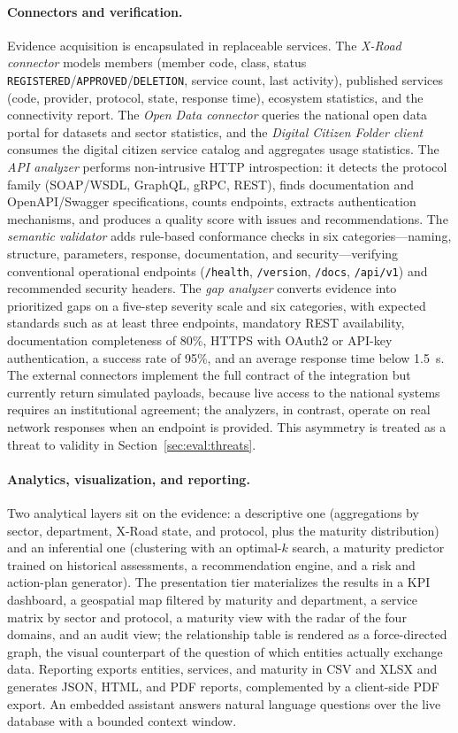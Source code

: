 \documentclass[runningheads]{llncs}
\begin{document}
\paragraph{Connectors and verification.} Evidence acquisition is encapsulated
in replaceable services. The \emph{X-Road connector} models members (member
code, class, status \texttt{REGISTERED}/\texttt{APPROVED}/\texttt{DELETION},
service count, last activity), published services (code, provider, protocol,
state, response time), ecosystem statistics, and the connectivity report. The
\emph{Open Data connector} queries the national open data portal for datasets
and sector statistics, and the \emph{Digital Citizen Folder client} consumes
the digital citizen service catalog and aggregates usage statistics. The
\emph{API analyzer} performs non-intrusive HTTP introspection: it detects the
protocol family (SOAP/WSDL, GraphQL, gRPC, REST), finds documentation and
OpenAPI/Swagger specifications, counts endpoints, extracts authentication
mechanisms, and produces a quality score with issues and recommendations. The
\emph{semantic validator} adds rule-based conformance checks in six
categories---naming, structure, parameters, response, documentation, and
security---verifying conventional operational endpoints
(\texttt{/health}, \texttt{/version}, \texttt{/docs}, \texttt{/api/v1}) and
recommended security headers. The \emph{gap analyzer} converts evidence into
prioritized gaps on a five-step severity scale and six categories, with
expected standards such as at least three endpoints, mandatory REST
availability, documentation completeness of 80\%, HTTPS with OAuth2 or API-key
authentication, a success rate of 95\%, and an average response time below
1.5~s. The external connectors implement the full contract of the integration
but currently return simulated payloads, because live access to the national
systems requires an institutional agreement; the analyzers, in contrast,
operate on real network responses when an endpoint is provided. This
asymmetry is treated as a threat to validity in Section~\ref{sec:eval:threats}.

\paragraph{Analytics, visualization, and reporting.} Two analytical layers
sit on the evidence: a descriptive one (aggregations by sector, department,
X-Road state, and protocol, plus the maturity distribution) and an inferential
one (clustering with an optimal-$k$ search, a maturity predictor trained on
historical assessments, a recommendation engine, and a risk and action-plan
generator). The presentation tier materializes the results in a KPI dashboard,
a geospatial map filtered by maturity and department, a service matrix by
sector and protocol, a maturity view with the radar of the four domains, and
an audit view; the relationship table is rendered as a force-directed graph,
the visual counterpart of the question of which entities actually exchange
data. Reporting exports entities, services, and maturity in CSV and XLSX and
generates JSON, HTML, and PDF reports, complemented by a client-side PDF
export. An embedded assistant answers natural language questions over the live
database with a bounded context window.
\end{document}
